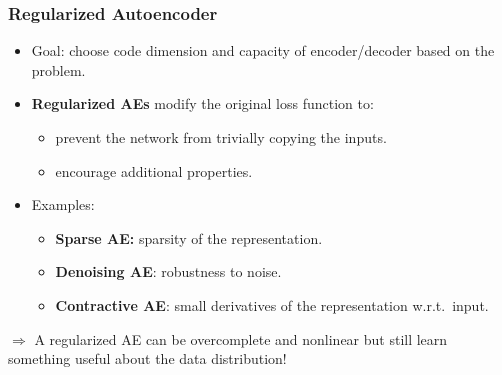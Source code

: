 
  
  
    

  \begin{frame}

  \frametitle{Regularized Autoencoder}
  
 
    \begin{itemize}
       \item Goal: choose code dimension and capacity of encoder/decoder based on the problem.
       \item \textbf{Regularized AEs} modify the original loss function to:
       \begin{itemize}
       \item prevent the network from trivially copying the inputs.
       \item encourage additional properties.
       \end{itemize}
       
     
        \item Examples:
            \begin{itemize}
                \item \textbf{Sparse AE:} sparsity of the representation.
                \item \textbf{Denoising AE}: robustness to noise.%
                \item \textbf{Contractive AE}: small derivatives of the representation w.r.t.~input.
            \end{itemize}
   
    \end{itemize} 
    $\Rightarrow$ 
    A regularized AE can be overcomplete and nonlinear but still learn something useful about the data distribution!  
  
  
\end{frame}


